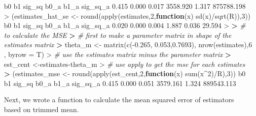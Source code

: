 \documentclass[
]{article}
\newenvironment{Shaded}{\begin{snugshade}}{\end{snugshade}}
\newcommand{\AttributeTok}[1]{\textcolor[rgb]{0.77,0.63,0.00}{#1}}
\newcommand{\CommentTok}[1]{\textcolor[rgb]{0.56,0.35,0.01}{\textit{#1}}}
\newcommand{\ControlFlowTok}[1]{\textcolor[rgb]{0.13,0.29,0.53}{\textbf{#1}}}
\newcommand{\DecValTok}[1]{\textcolor[rgb]{0.00,0.00,0.81}{#1}}
\newcommand{\ErrorTok}[1]{\textcolor[rgb]{0.64,0.00,0.00}{\textbf{#1}}}
\newcommand{\FloatTok}[1]{\textcolor[rgb]{0.00,0.00,0.81}{#1}}
\newcommand{\FunctionTok}[1]{\textcolor[rgb]{0.00,0.00,0.00}{#1}}
\newcommand{\NormalTok}[1]{#1}
\newcommand{\OtherTok}[1]{\textcolor[rgb]{0.56,0.35,0.01}{#1}}
\newcommand{\SpecialCharTok}[1]{\textcolor[rgb]{0.00,0.00,0.00}{#1}}
\begin{document}
\begin{Shaded}
\begin{Highlighting}[]
\NormalTok{        b0         b1     sig\_sq       b0\_a       b1\_a   sig\_sq\_a }
     \FloatTok{0.415}      \FloatTok{0.000}      \FloatTok{0.017}   \FloatTok{3558.920}      \FloatTok{1.317} \FloatTok{875788.198} 
\SpecialCharTok{\textgreater{}}\NormalTok{ (estimates\_hat\_se }\OtherTok{\textless{}{-}} \FunctionTok{round}\NormalTok{(}\FunctionTok{apply}\NormalTok{(estimates,}\DecValTok{2}\NormalTok{,}\ControlFlowTok{function}\NormalTok{(x) }\FunctionTok{sd}\NormalTok{(x)}\SpecialCharTok{/}\FunctionTok{sqrt}\NormalTok{(R)),}\DecValTok{3}\NormalTok{))}
\NormalTok{      b0       b1   sig\_sq     b0\_a     b1\_a sig\_sq\_a }
   \FloatTok{0.020}    \FloatTok{0.000}    \FloatTok{0.004}    \FloatTok{1.887}    \FloatTok{0.036}   \FloatTok{29.594} 
\SpecialCharTok{\textgreater{}} 
\ErrorTok{\textgreater{}} \CommentTok{\# to calculate the MSE}
\ErrorTok{\textgreater{}} \CommentTok{\# first to make a parameter matrix in shape of the estimates matrix}
\ErrorTok{\textgreater{}}\NormalTok{ theta\_m }\OtherTok{\textless{}{-}} \FunctionTok{matrix}\NormalTok{(}\FunctionTok{c}\NormalTok{(}\SpecialCharTok{{-}}\FloatTok{0.265}\NormalTok{, }\FloatTok{0.053}\NormalTok{,}\FloatTok{0.7693}\NormalTok{), }\FunctionTok{nrow}\NormalTok{(estimates),}\DecValTok{6}\NormalTok{ , }\AttributeTok{byrow =}\NormalTok{ T)}
\SpecialCharTok{\textgreater{}} \CommentTok{\# use the estimates matrix minus the parameter matrix}
\ErrorTok{\textgreater{}}\NormalTok{ est\_cent }\OtherTok{\textless{}{-}}\NormalTok{estimates}\SpecialCharTok{{-}}\NormalTok{theta\_m}
\SpecialCharTok{\textgreater{}} \CommentTok{\# use apply to get the mse for each estimates}
\ErrorTok{\textgreater{}}\NormalTok{ (estimates\_mse }\OtherTok{\textless{}{-}} \FunctionTok{round}\NormalTok{(}\FunctionTok{apply}\NormalTok{(est\_cent,}\DecValTok{2}\NormalTok{,}\ControlFlowTok{function}\NormalTok{(x) }\FunctionTok{sum}\NormalTok{(x}\SpecialCharTok{\^{}}\DecValTok{2}\NormalTok{)}\SpecialCharTok{/}\NormalTok{R),}\DecValTok{3}\NormalTok{))}
\NormalTok{        b0         b1     sig\_sq       b0\_a       b1\_a   sig\_sq\_a }
     \FloatTok{0.415}      \FloatTok{0.000}      \FloatTok{0.051}   \FloatTok{3579.161}      \FloatTok{1.324} \FloatTok{889543.113} 
\end{Highlighting}
\end{Shaded}

Next, we wrote a function to calculate the mean squared error of
estimators based on trimmed mean.
\end{document}
